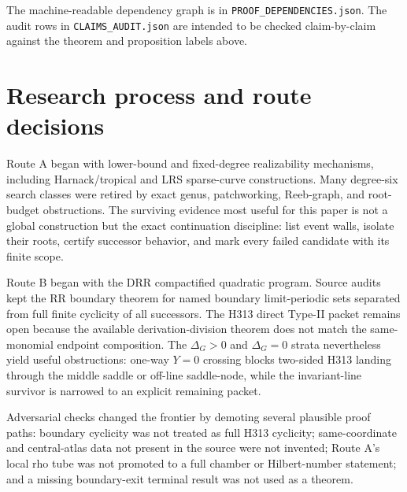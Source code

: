 \documentclass[11pt]{article}
\begin{document}
The machine-readable dependency graph is in \texttt{PROOF\_DEPENDENCIES.json}.  The audit rows in \texttt{CLAIMS\_AUDIT.json} are intended to be checked claim-by-claim against the theorem and proposition labels above.

\section{Research process and route decisions}
Route A began with lower-bound and fixed-degree realizability mechanisms, including Harnack/tropical and LRS sparse-curve constructions.  Many degree-six search classes were retired by exact genus, patchworking, Reeb-graph, and root-budget obstructions.  The surviving evidence most useful for this paper is not a global construction but the exact continuation discipline: list event walls, isolate their roots, certify successor behavior, and mark every failed candidate with its finite scope.

Route B began with the DRR compactified quadratic program.  Source audits kept the RR boundary theorem for named boundary limit-periodic sets separated from full finite cyclicity of all successors.  The H313 direct Type-II packet remains open because the available derivation-division theorem does not match the same-monomial endpoint composition.  The \(\Delta_G>0\) and \(\Delta_G=0\) strata nevertheless yield useful obstructions: one-way \(Y=0\) crossing blocks two-sided H313 landing through the middle saddle or off-line saddle-node, while the invariant-line survivor is narrowed to an explicit remaining packet.

Adversarial checks changed the frontier by demoting several plausible proof paths: boundary cyclicity was not treated as full H313 cyclicity; same-coordinate and central-atlas data not present in the source were not invented; Route A's local rho tube was not promoted to a full chamber or Hilbert-number statement; and a missing boundary-exit terminal result was not used as a theorem.
\end{document}
